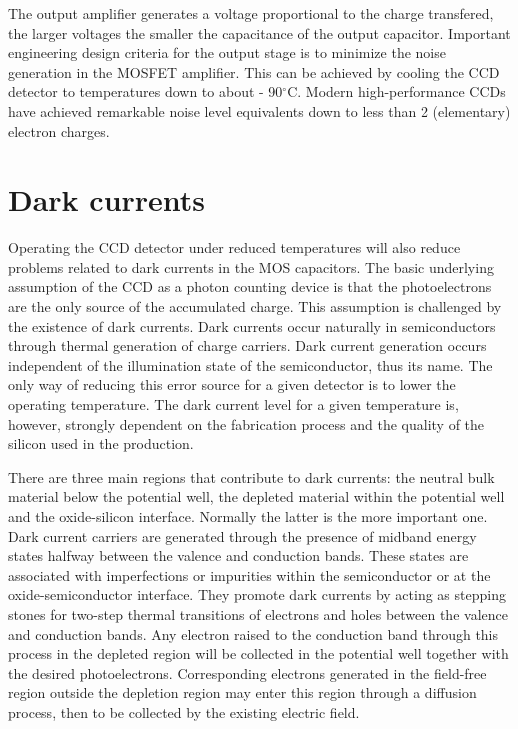 The output amplifier generates a voltage proportional to the charge
transfered, the larger voltages the smaller the capacitance of the
output capacitor. Important engineering design criteria for the output
stage is to minimize the noise generation in the MOSFET
amplifier. This can be achieved by cooling the CCD detector to
temperatures down to about - 90$^\circ$C.  Modern
high-performance CCDs have achieved remarkable noise level
equivalents down to less than 2 (elementary) electron charges.

\section{Dark currents}

Operating the CCD detector under reduced temperatures will also reduce
problems related to dark currents in the MOS capacitors. The basic
underlying assumption of the CCD as a photon counting device is that
the photoelectrons are the only source of the accumulated charge. This
assumption is challenged by the existence of dark currents. Dark
currents occur naturally in semiconductors through thermal generation
of charge carriers. Dark current generation occurs independent of the
illumination state of the semiconductor, thus its name. The only way
of reducing this error source for a given detector is to lower the
operating temperature. The dark current level for a given temperature
is, however, strongly dependent on the fabrication process and the
quality of the silicon used in the production.

There are three main regions that contribute to dark currents: the
neutral bulk material below the potential well, the depleted material
within the potential well and the oxide-silicon interface. Normally
the latter is the more important one. Dark current carriers are
generated through the presence of midband energy states halfway
between the valence and conduction bands. These states are associated
with imperfections or impurities within the semiconductor or at the
oxide-semiconductor interface. They promote dark currents by acting as
stepping stones for two-step thermal transitions of electrons and
holes between the valence and conduction bands. Any electron raised to
the conduction band through this process in the depleted region will
be collected in the potential well together with the desired
photoelectrons. Corresponding electrons generated in the field-free
region outside the depletion region may enter this region through a
diffusion process, then to be collected by the existing electric field.
 
